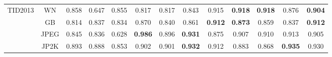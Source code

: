 \begin{table}[!ht]
{\begin{tabular}{c|c|ccccccccccc}
				\multirow{4}{*}{TID2013} & WN & 0.858 & 0.647 & 0.855 & 0.817 & 0.817 & 0.843 & 0.915 & \textbf{0.918} & \textbf{0.918} & \multicolumn{1}{c|}{0.876} & \textbf{0.904} \\
				& GB & 0.814 & 0.837 & 0.834 & 0.870 & 0.840 & 0.861 & \textbf{0.912} & \textbf{0.873} & 0.859 & \multicolumn{1}{c|}{0.837} & \textbf{0.912} \\
				& JPEG & 0.845 & 0.836 & 0.628 & \textbf{0.986} & 0.896 & \textbf{0.931} & 0.875 & 0.907 & 0.910 & \multicolumn{1}{c|}{0.913} & 0.905 \\
				& JP2K & 0.893 & 0.888 & 0.853 & 0.902 & 0.901 & \textbf{0.932} & 0.912 & 0.883 & 0.868 & \multicolumn{1}{c|}{\textbf{0.935}} & 0.930 \\ \bottomrule
			\end{tabular}
		}
	\end{table}

